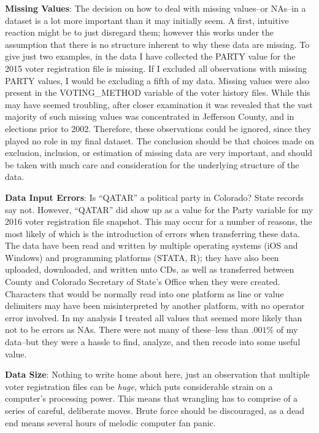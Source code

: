 \documentclass[12pt,twoside]{reedthesis}
\begin{document}
  \textbf{Missing Values}: The decision on how to deal with missing
  values--or NAs--in a dataset is a lot more important than it may
  initially seem. A first, intuitive reaction might be to just disregard
  them; however this works under the assumption that there is no structure
  inherent to why these data are missing. To give just two examples, in
  the data I have collected the PARTY value for the 2015 voter
  registration file is missing. If I excluded all observations with
  missing PARTY values, I would be excluding a fifth of my data. Missing
  values were also present in the VOTING\_METHOD variable of the voter
  history files. While this may have seemed troubling, after closer
  examination it was revealed that the vast majority of such missing
  values was concentrated in Jefferson County, and in elections prior to
  2002. Therefore, these observations could be ignored, since they played
  no role in my final dataset. The conclusion should be that choices made
  on exclusion, inclusion, or estimation of missing data are very
  important, and should be taken with much care and consideration for the
  underlying structure of the data.
  
  \textbf{Data Input Errors}: Is ``QATAR'' a political party in Colorado?
  State records say not. However, ``QATAR'' did show up as a value for the
  Party variable for my 2016 voter registration file snapshot. This may
  occur for a number of reasons, the most likely of which is the
  introduction of errors when transferring these data. The data have been
  read and written by multiple operating systems (iOS and Windows) and
  programming platforms (STATA, R); they have also been uploaded,
  downloaded, and written unto CDs, as well as transferred between County
  and Colorado Secretary of State's Office when they were created.
  Characters that would be normally read into one platform as line or
  value delimiters may have been misinterpreted by another platform, with
  no operator error involved. In my analysis I treated all values that
  seemed more likely than not to be errors as NAs. There were not many of
  these--less than \(.001\%\) of my data--but they were a hassle to find,
  analyze, and then recode into some useful value.
  
  \textbf{Data Size}: Nothing to write home about here, just an
  observation that multiple voter registration files can be \emph{huge},
  which puts considerable strain on a computer's processing power. This
  means that wrangling has to comprise of a series of careful, deliberate
  moves. Brute force should be discouraged, as a dead end means several
  hours of melodic computer fan panic.
  
\end{document}
